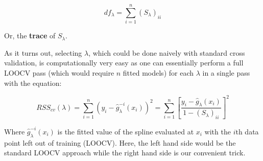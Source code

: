 $$ df_{\lambda} = \sum^{n}_{i=1}(S_{\lambda})_{ii} $$

Or, the \textbf{trace} of $S_{\lambda}$.

As it turns out, selecting $\lambda$, which could be done naively with standard cross validation, is computationally very easy as one can essentially perform a full LOOCV pass (which would require $n$ fitted models) for each $\lambda$ in a single pass with the equation:

$$ RSS_{cv}(\lambda) = \sum^{n}_{i=1}(y_{i}-\hat{g}_{\lambda}^{-i}(x_{i}))^{2} = \sum^{n}_{i=1}\left[ \frac{y_{i}-\hat{g}_{\lambda}(x_{i})}{1-(S_{\lambda})_{ii}} \right]^{2} $$

Where $\hat{g}_{\lambda}^{-i}(x_{i})$ is the fitted value of the spline evaluated at $x_{i}$ with the $i$th data point left out of training (LOOCV). Here, the left hand side would be the standard LOOCV approach while the right hand side is our convenient trick.
